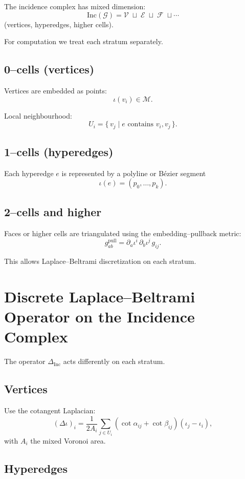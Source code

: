 The incidence complex has mixed dimension:
\[
  \mathrm{Inc}(\mathcal{G}) = 
   \mathcal{V} \;\sqcup\; \mathcal{E} \;\sqcup\; \mathcal{F} \;\sqcup \cdots
\]
(vertices, hyperedges, higher cells).

For computation we treat each stratum separately.

\subsection{0–cells (vertices)}

Vertices are embedded as points:
\[
 \iota(v_i) \in \mathcal{M}.
\]

Local neighbourhood:
\[
 U_i = \{\,v_j \mid e \text{ contains } v_i,v_j\,\}.
\]

\subsection{1–cells (hyperedges)}

Each hyperedge $e$ is represented by a polyline or Bézier segment
\[
 \iota(e) = (p_0,\dots,p_k).
\]

\subsection{2–cells and higher}

Faces or higher cells are triangulated using the embedding–pullback metric:
\[
 g_{ab}^{\text{pull}} = \partial_a \iota^i\, \partial_b \iota^j \, g_{ij}.
\]

This allows Laplace–Beltrami discretization on each stratum.

\section{Discrete Laplace–Beltrami Operator on the Incidence Complex}

The operator $\Delta_{\mathrm{Inc}}$ acts differently on each stratum.

\subsection{Vertices}

Use the cotangent Laplacian:
\[
 (\Delta \iota)_i
   = \frac{1}{2A_i}
     \sum_{j\in U_i} (\cot\alpha_{ij} + \cot\beta_{ij})(\iota_j - \iota_i),
\]
with $A_i$ the mixed Voronoi area.

\subsection{Hyperedges}

